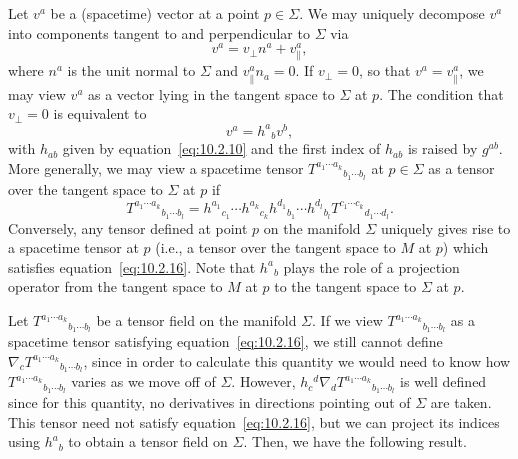Let \(v^a\) be a (spacetime) vector at a point \(p\in\Sigma\). We may uniquely
decompose \(v^a\) into components tangent to and perpendicular to \(\Sigma\) via
\begin{equation}
  v^a=v_\perp n^a+v_\parallel^a,
  \tag{10.2.14}\label{eq:10.2.14}
\end{equation}
where \(n^a\) is the unit normal to \(\Sigma\) and \(v_\parallel^an_a=0\). If
\(v_\perp=0\), so that \(v^a=v_\parallel^a\), we may view \(v^a\) as a vector lying
in the tangent space to \(\Sigma\) at \(p\). The condition that \(v_\perp=0\) is
equivalent to
\begin{equation}
  v^a=h^a{}_bv^b,
  \tag{10.2.15}\label{eq:10.2.15}
\end{equation}
with \(h_{ab}\) given by equation~\eqref{eq:10.2.10} and the first index of \(h_{ab}\)
is raised by \(g^{ab}\). More generally, we may view a spacetime tensor
\(T^{a_1\cdots a_k}{}_{b_1\cdots b_l}\) at \(p\in\Sigma\) as a tensor over the
tangent space to \(\Sigma\) at \(p\) if
\begin{equation}
  T^{a_1\cdots a_k}{}_{b_1\cdots b_l}
  =h^{a_1}{}_{c_1}\cdots h^{a_k}{}_{c_k}
   h^{d_1}{}_{b_1}\cdots h^{d_l}{}_{b_l}
   T^{c_1\cdots c_k}{}_{d_1\cdots d_l}.
  \tag{10.2.16}\label{eq:10.2.16}
\end{equation}
Conversely, any tensor defined at point \(p\) on the manifold \(\Sigma\) uniquely
gives rise to a spacetime tensor at \(p\) (i.e., a tensor over the tangent space to
\(M\) at \(p\)) which satisfies equation~\eqref{eq:10.2.16}. Note that \(h^a{}_b\)
plays the role of a projection operator from the tangent space to \(M\) at \(p\) to the
tangent space to \(\Sigma\) at \(p\).

Let \(T^{a_1\cdots a_k}{}_{b_1\cdots b_l}\) be a tensor field on the manifold
\(\Sigma\). If we view \(T^{a_1\cdots a_k}{}_{b_1\cdots b_l}\) as a spacetime
tensor satisfying equation~\eqref{eq:10.2.16}, we still cannot define
\(\nabla_cT^{a_1\cdots a_k}{}_{b_1\cdots b_l}\), since in order to calculate this
quantity we would need to know how \(T^{a_1\cdots a_k}{}_{b_1\cdots b_l}\) varies
as we move off of \(\Sigma\). However,
\(h_c{}^d\nabla_dT^{a_1\cdots a_k}{}_{b_1\cdots b_l}\) is well defined since for
this quantity, no derivatives in directions pointing out of \(\Sigma\) are taken. This
tensor need not satisfy equation~\eqref{eq:10.2.16}, but we can project its indices
using \(h^a{}_b\) to obtain a tensor field on \(\Sigma\). Then, we have the following
result.

